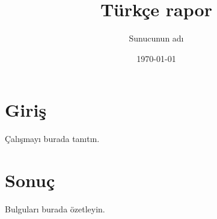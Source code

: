\documentclass[12pt]{report}
\title{Türkçe rapor}
\author{Sunucunun adı}
\date{\today}
\begin{document}
\maketitle
\tableofcontents

\chapter{Giriş}
Çalışmayı burada tanıtın.

\chapter{Sonuç}
Bulguları burada özetleyin.

% 
\end{document}
